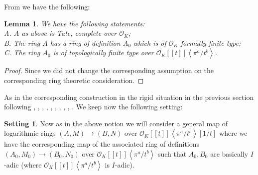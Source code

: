 \documentclass[11pt]{book}
\newtheorem{lemma}[theorem]{Lemma}
\theoremstyle{definition}
\numberwithin{equation}{section}
\newtheorem{setting}[theorem]{Setting}
\begin{document}
\indent From \cite[Definition 3.1, and below Definition 3.1]{12Bel1} we have the following:

\begin{lemma} We have the following statements:\\
A. $A$ as above is Tate, complete over $\mathcal{O}_K$;\\
B. The ring $A$ has a ring of definition $A_0$ which is of $\mathcal{O}_K$-formally finite type;\\
C. The ring $A_0$ is of topologically finite type over $\mathcal{O}_K[[t]]\left<\pi^a/t^b\right>$.
\end{lemma}


\begin{proof}
Since we did not change the corresponding assumption on the corresponding ring theoretic consideration.
\end{proof}



As in the corresponding construction in the rigid situation in the previous section following \cite[Chapitre 3]{12An1}, \cite{12An2}, \cite[Chapter 5, Chapter 6, Chapter 7]{12B1}, \cite[Chapter 1]{12Bei}, \cite[Chapter 5]{12G1}, \cite[Chapter 3, Chapter 4]{12GL}, \cite[Chapitre II, Chapitre III]{12Ill1}, \cite[Chapitre VIII]{12Ill2}, \cite[Chapter 8]{12O}, \cite[Section 4]{12Qui}. We keep now the following setting:


\begin{setting}
Now as in the above notion we will consider a general map of logarithmic rings $(A,M)\rightarrow (B,N)$ over $\mathcal{O}_K[[t]]\left<\pi^a/t^b\right>[1/t]$ where we have the corresponding map of the associated ring of definitions $(A_0,M_0)\rightarrow (B_0,N_0)$ over $\mathcal{O}_K[[t]]\left<\pi^a/t^b\right>$ such that $A_0,B_0$ are basically $I$-adic (where $\mathcal{O}_K[[t]]\left<\pi^a/t^b\right>$ is $I$-adic).	
\end{setting}

 
\end{document}
